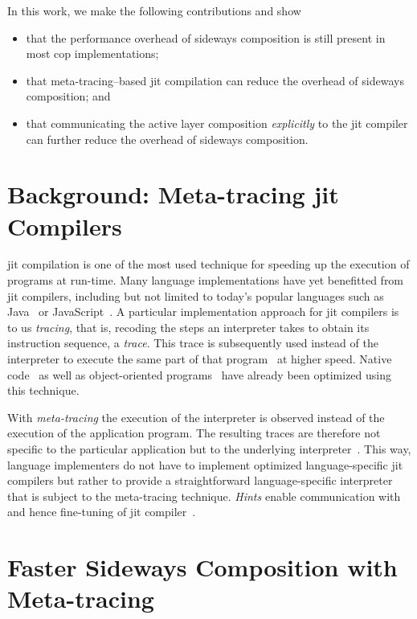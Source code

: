 \documentclass[preprint,english,10pt,nonatbib]{sigplanconf}
\begin{document}
In this work, we make the following contributions and show
\begin{itemize}
\item that the performance overhead of sideways composition is still
  present in most \ac{cop} implementations;
\item that meta-tracing--based \ac{jit} compilation can reduce the
  overhead of sideways composition; and
\item that communicating the active layer composition \emph{explicitly} to the
  \ac{jit} compiler can further reduce the overhead of sideways composition.
\end{itemize}


\section{Background: Meta-tracing \acs{jit} Compilers}

\Acf{jit} compilation is one of the most used technique for speeding up the
execution of programs at run-time. Many language implementations have yet
benefitted from \ac{jit} compilers, including but not limited to today's
popular languages such as Java~\cite{paleczny+:2001:java-hotspot} or
JavaScript~\cite{holtta:2013:crankshafting-from}. A particular implementation
approach for \ac{jit} compilers is to us \emph{tracing}, that is, recoding the
steps an interpreter takes to obtain its instruction sequence, a \emph{trace}.
This trace is subsequently used instead of the interpreter to execute the same
part of that program~\cite{mitchell:1970:design-construction} at higher speed.
Native code~\cite{bala+:2000:dynamo:-transparent} as well as object-oriented
programs~\cite{gal+:2006:hotpathvm:-effective} have already been optimized
using this technique.

With \emph{meta-tracing} the execution of the interpreter is observed instead
of the execution of the application program. The resulting traces are therefore
not specific to the particular application but to the underlying
interpreter~\cite{bolz+:2009:tracing-meta-level:}. This way, language
implementers do not have to implement optimized language-specific \ac{jit}
compilers but rather to provide a straightforward language-specific interpreter
that is subject to the meta-tracing technique. \emph{Hints} enable
communication with and hence fine-tuning of \ac{jit}
compiler~\cite{bolz_runtime_2011}.

\section{Faster Sideways Composition with Meta-tracing}
\end{document}
